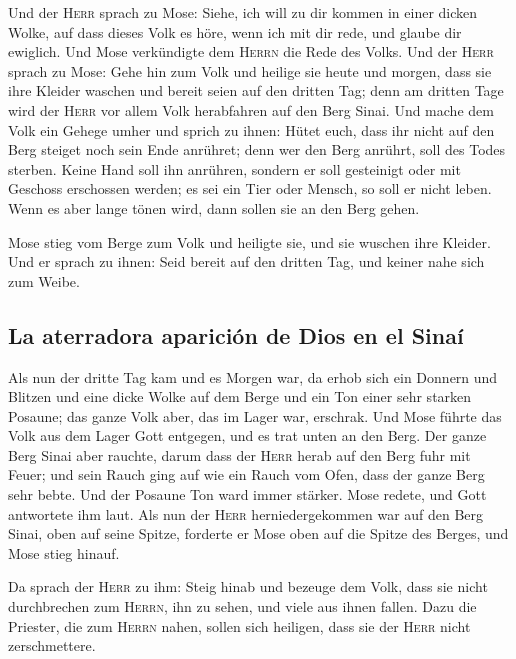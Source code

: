  Und der \textsc{Herr} sprach zu Mose: Siehe, ich will zu
dir kommen in einer dicken Wolke, auf dass dieses Volk es höre, wenn ich
mit dir rede, und glaube dir ewiglich. Und Mose verkündigte dem
\textsc{Herrn} die Rede des Volks.  Und der \textsc{Herr}
sprach zu Mose: Gehe hin zum Volk und heilige sie heute und morgen, dass
sie ihre Kleider waschen  und bereit seien auf den
dritten Tag; denn am dritten Tage wird der \textsc{Herr} vor allem Volk
herabfahren auf den Berg Sinai.  Und mache dem Volk ein
Gehege umher und sprich zu ihnen: Hütet euch, dass ihr nicht auf den
Berg steiget noch sein Ende anrühret; denn wer den Berg anrührt, soll
des Todes sterben.  Keine Hand soll ihn anrühren, sondern
er soll gesteinigt oder mit Geschoss erschossen werden; es sei ein Tier
oder Mensch, so soll er nicht leben. Wenn es aber lange tönen wird, dann
sollen sie an den Berg gehen.

 Mose stieg vom Berge zum Volk und heiligte sie, und sie
wuschen ihre Kleider.  Und er sprach zu ihnen: Seid
bereit auf den dritten Tag, und keiner nahe sich zum Weibe.

\hypertarget{la-aterradora-apariciuxf3n-de-dios-en-el-sinauxed}{%
\subsection{La aterradora aparición de Dios en el
Sinaí}\label{la-aterradora-apariciuxf3n-de-dios-en-el-sinauxed}}

 Als nun der dritte Tag kam und es Morgen war, da erhob
sich ein Donnern und Blitzen und eine dicke Wolke auf dem Berge und ein
Ton einer sehr starken Posaune; das ganze Volk aber, das im Lager war,
erschrak.  Und Mose führte das Volk aus dem Lager Gott
entgegen, und es trat unten an den Berg.  Der ganze Berg
Sinai aber rauchte, darum dass der \textsc{Herr} herab auf den Berg fuhr
mit Feuer; und sein Rauch ging auf wie ein Rauch vom Ofen, dass der
ganze Berg sehr bebte.  Und der Posaune Ton ward immer
stärker. Mose redete, und Gott antwortete ihm laut.  Als
nun der \textsc{Herr} herniedergekommen war auf den Berg Sinai, oben auf
seine Spitze, forderte er Mose oben auf die Spitze des Berges, und Mose
stieg hinauf.

 Da sprach der \textsc{Herr} zu ihm: Steig hinab und
bezeuge dem Volk, dass sie nicht durchbrechen zum \textsc{Herrn}, ihn zu
sehen, und viele aus ihnen fallen.  Dazu die Priester,
die zum \textsc{Herrn} nahen, sollen sich heiligen, dass sie der
\textsc{Herr} nicht zerschmettere.

